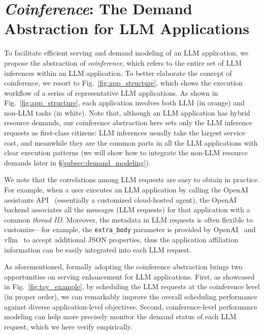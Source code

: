 \section{\emph{Coinference}: The Demand Abstraction for LLM Applications}
\label{sec:abstraction}


To facilitate efficient serving and demand modeling of an LLM application, we propose the abstraction of \emph{coinference}, which refers to the entire set of LLM inferences within an LLM application.
To better elaborate the concept of coinference, we resort to Fig.~\ref{fig:app_structure}, which shows the execution workflow of a series of representative LLM applications.
As shown in Fig.~\ref{fig:app_structure}, each application involves both LLM (in orange) and non-LLM tasks (in white).
Note that, although an LLM application has hybrid resource demands, our coinference abstraction here sets only the LLM inference requests as first-class citizens: LLM inferences usually take the largest service cost, and meanwhile they are the common parts in all the LLM applications with clear execution patterns (we will show how to integrate the non-LLM resource demands later in \S\ref{subsec:demand_modeling}).

We note that the correlations among LLM requests are easy to obtain in practice. 
For example, when a user executes an LLM application by calling the OpenAI assistants API~\cite{assistants_api} (essentially a customized cloud-hosted agent), the OpenAI backend associates all the messages (LLM requests) for that application with a common \emph{thread ID}.
Moreover, the metadata in LLM requests is often flexible to customize---for example, the \texttt{extra\_body} parameter is provided by OpenAI~\cite{OpenAI_extra_body} and vllm~\cite{vLLM_extra_body} to accept additional JSON properties, thus the application affiliation information can be easily integrated into each LLM request.  



As aforementioned, formally adopting the coinference abstraction brings two opportunities on serving enhancement for LLM applications.
First, as showcased in Fig.~\ref{fig:toy_example}, by scheduling the LLM requests at the coinference level (in proper order), we can remarkably improve the overall scheduling performance against diverse application-level objectives. 
Second, coinference-level performance modeling can help more precisely monitor the demand status of each LLM request, which we here verify empirically. 

